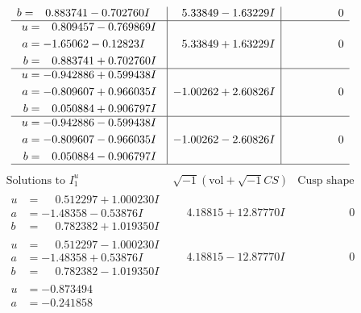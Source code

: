 \documentclass[1p]{elsarticle_modified}
\theoremstyle{definition}
\newcommand{\I}{\sqrt{-1}}
\begin{document}
$$\begin{array}{c|c|c}
\begin{aligned}
b &= \phantom{-}0.883741 - 0.702760 I\end{aligned}
 & \phantom{-}5.33849 - 1.63229 I & \phantom{-0.000000 } 0 \\ \hline\begin{aligned}
u &= \phantom{-}0.809457 - 0.769869 I \\
a &= -1.65062 - 0.12823 I \\
b &= \phantom{-}0.883741 + 0.702760 I\end{aligned}
 & \phantom{-}5.33849 + 1.63229 I & \phantom{-0.000000 } 0 \\ \hline\begin{aligned}
u &= -0.942886 + 0.599438 I \\
a &= -0.809607 + 0.966035 I \\
b &= \phantom{-}0.050884 + 0.906797 I\end{aligned}
 & -1.00262 + 2.60826 I & \phantom{-0.000000 } 0 \\ \hline\begin{aligned}
u &= -0.942886 - 0.599438 I \\
a &= -0.809607 - 0.966035 I \\
b &= \phantom{-}0.050884 - 0.906797 I\end{aligned}
 & -1.00262 - 2.60826 I & \phantom{-0.000000 } 0\\
 \hline 
 \end{array}$$\newpage$$\begin{array}{c|c|c}  
\text{Solutions to }I^u_{1}& \I (\text{vol} + \sqrt{-1}CS) & \text{Cusp shape}\\
 \hline 
\begin{aligned}
u &= \phantom{-}0.512297 + 1.000230 I \\
a &= -1.48358 - 0.53876 I \\
b &= \phantom{-}0.782382 + 1.019350 I\end{aligned}
 & \phantom{-}4.18815 + 12.87770 I & \phantom{-0.000000 } 0 \\ \hline\begin{aligned}
u &= \phantom{-}0.512297 - 1.000230 I \\
a &= -1.48358 + 0.53876 I \\
b &= \phantom{-}0.782382 - 1.019350 I\end{aligned}
 & \phantom{-}4.18815 - 12.87770 I & \phantom{-0.000000 } 0 \\ \hline\begin{aligned}
u &= -0.873494\phantom{ +0.000000I} \\
a &= -0.241858\phantom{ +0.000000I} \\

\end{aligned}
\end{array}$$
\end{document}

